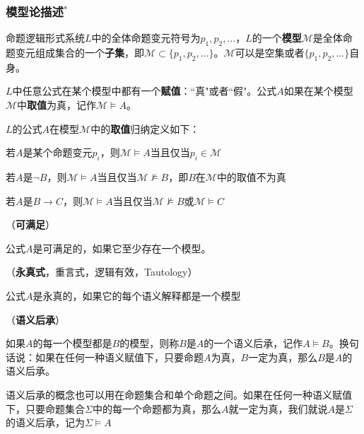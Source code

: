\subsubsection{模型论描述${}^*$}

命题逻辑形式系统$L$中的全体命题变元符号为$p_1, p_2,...$，$L$的一个\textbf{模型}$\mathcal{M}$是全体命题变元组成集合的一个\textbf{子集}，即$\mathcal{M} \subset \{p_1, p_2, ...\}$。$\mathcal{M}$可以是空集或者$\{p_1, p_2, ... \}$自身。

$L$中任意公式在某个模型中都有一个\textbf{赋值}：``真"或者``假"。公式$A$如果在某个模型$\mathcal{M}$中\textbf{取值}为真，记作$\mathcal{M} \models A$。

\begin{defn}

$L$的公式$A$在模型$\mathcal{M}$中的\textbf{取值}归纳定义如下：

\begin{tightenum}
  \item 若$A$是某个命题变元$p_i$，则$\mathcal{M} \models A$当且仅当$p_i \in \mathcal{M}$
  \item 若$A$是$\neg B$，则$\mathcal{M} \models A$当且仅当$\mathcal{M} \nvDash B$，即$B$在$\mathcal{M}$中的取值不为真
  \item 若$A$是$B \to C$，则$\mathcal{M} \models A$当且仅当$\mathcal{M} \nvDash B$或$\mathcal{M} \models C$
\end{tightenum}

\end{defn}


\begin{defn}（\textbf{可满足}）

公式$A$是可满足的，如果它至少存在一个模型。
\end{defn}



\begin{defn}（\textbf{永真式}，重言式，逻辑有效，Tautology）

公式$A$是永真的，如果它的每个语义解释都是一个模型

\end{defn}

\begin{defn}（\textbf{语义后承}）

如果$A$的每一个模型都是$B$的模型，则称$B$是$A$的一个语义后承，记作$A \models B$。换句话说：如果在任何一种语义赋值下，只要命题$A$为真，$B$一定为真，那么$B$是$A$的语义后承。

语义后承的概念也可以用在命题集合和单个命题之间。如果在任何一种语义赋值下，只要命题集合$\Sigma$中的每一个命题都为真，那么$A$就一定为真，我们就说$A$是$\Sigma$的语义后承，记为$\Sigma \models A$

\end{defn}



